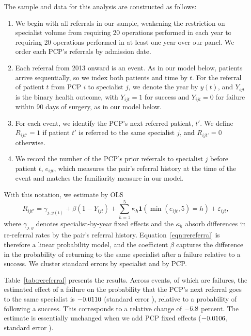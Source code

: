 \documentclass[12pt]{article}
\begin{document}
The sample and data for this analysis are constructed as follows:
\begin{enumerate}
\item We begin with all referrals in our sample, weakening the restriction on specialist volume from requiring 20 operations performed in each year to requiring 20 operations performed in at least one year over our panel. We order each PCP's referrals by admission date.

\item Each referral from 2013 onward is an event. As in our model below, patients arrive sequentially, so we index both patients and time by $t$. For the referral of patient $t$ from PCP $i$ to specialist $j$, we denote the year by $y(t)$, and $Y_{ijt}$ is the binary health outcome, with $Y_{ijt}=1$ for success and $Y_{ijt}=0$ for failure within 90 days of surgery, as in our model below.

\item For each event, we identify the PCP's next referred patient, $t'$. We define $R_{ijt'} = 1$ if patient $t'$ is referred to the same specialist $j$, and $R_{ijt'} = 0$ otherwise.

\item We record the number of the PCP's prior referrals to specialist $j$ before patient $t$, $e_{ijt}$, which measures the pair's referral history at the time of the event and matches the familiarity measure in our model.
\end{enumerate}
With this notation, we estimate by OLS
\begin{equation}
  R_{ijt'} = \gamma_{j,y(t)} + \beta (1-Y_{ijt}) + \sum_{h=1}^{5} \kappa_h \mathbf{1}\left(\min(e_{ijt},5)=h\right) + \varepsilon_{ijt},
  \label{eqn:rereferral}
\end{equation}
where $\gamma_{j,y}$ denotes specialist-by-year fixed effects and the $\kappa_h$ absorb differences in re-referral rates by the pair's referral history. Equation~\eqref{eqn:rereferral} is therefore a linear probability model, and the coefficient $\beta$ captures the difference in the probability of returning to the same specialist after a failure relative to a success. We cluster standard errors by specialist and by PCP.

Table~\ref{tab:rereferral} presents the results. Across \rereferEvents{} events, of which \rereferFailures{} are failures, the estimated effect of a failure on the probability that the PCP's next referral goes to the same specialist is $-0.0110{}$ (standard error \rereferSE{}), relative to a probability of \rereferBase{} following a success. This corresponds to a relative change of $-6.8{}$ percent. The estimate is essentially unchanged when we add PCP fixed effects ($-0.0106{}$, standard error \rereferSEpcp{}).
\end{document}
